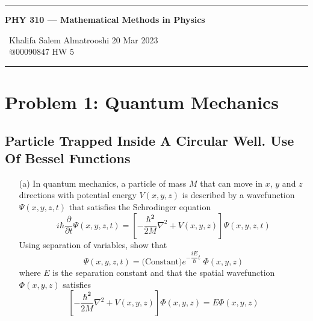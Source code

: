 \documentclass{article}
\begin{document}
	\begin{center}
		\hrule
		\vspace{0.4cm}
		{\textbf { \large PHY 310 --- Mathematical Methods in Physics}}
		\vspace{0.4cm}
	\end{center}
	{ \ Khalifa Salem Almatrooshi \hspace{\fill}  20 Mar 2023 \\
		{ } \ @00090847 \hspace{\fill}  HW 5 \\
		\hrule	
	
	\section*{Problem 1: Quantum Mechanics}
	\subsection*{Particle Trapped Inside A Circular Well. Use Of Bessel Functions}
	\begin{enumerate}
	\boldmath
		\item[(a)] In quantum mechanics, a particle of mass $M$ that can move in $x$, $y$ and $z$ directions with potential energy $V(x, y, z)$ is
		described by a wavefunction $\Psi(x, y, z, t)$ that satisfies the Schrodinger equation
		\[
			i\hbar \frac{\partial}{\partial t} \Psi(x, y, z, t) = \left[ -\frac{\bm{\hbar^2}}{2M} \nabla^2 + V(x, y, z) \right] \Psi(x, y, z, t) 
		\]
		Using separation of variables, show that
		\[
			\Psi(x, y, z, t) = \text{(Constant)} e^{-\dfrac{iE}{\bm{\hbar}}t} \; \Phi(x,y,z)
		\]
		where $E$ is the separation constant and that the spatial wavefunction $\Phi(x,y,z)$ satisfies
		\[
			\left[ -\frac{\bm{\hbar^2}}{2M} \nabla^2 + V(x, y, z) \right] \Phi(x,y,z) = E \Phi(x,y,z)
		\]
	\unboldmath

\end{enumerate}}
\end{document}
